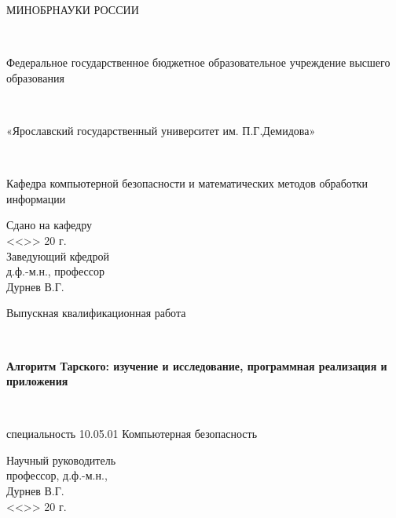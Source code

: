 \begin{titlepage}
    \begin{center}
        {\large МИНОБРНАУКИ РОССИИ
            
        ~
        
        Федеральное государственное бюджетное образовательное учреждение высшего образования		
        
        ~
        
        «Ярославский государственный университет им. П.Г.Демидова»
        
        ~
        
        Кафедра компьютерной безопасности и математических методов обработки информации}
        \vfill
        \newlength{\ML}
        \hfill\begin{minipage}{0.45\textwidth}
            \begin{flushright}
                Сдано на кафедру\\ 
                <<\underline{\hspace{1cm}}>> \underline{\hspace{2cm}} 20\underline{\hspace{1cm}} г.\\
                Заведующий кфедрой \\
                д.ф.-м.н., профессор\\
                \underline{\hspace{3cm}} Дурнев В.Г.\\
            \end{flushright}
        \end{minipage}%
        \vfill
        
        {\large Выпускная квалификационная работа}
        
        ~
        
        \textbf{{\large Алгоритм Тарского: изучение и исследование, программная реализация и приложения}}

        ~

        \large{специальность  10.05.01 Компьютерная безопасность}

    \end{center}
    \vfill
    
    
    \hfill\begin{minipage}{0.45\textwidth}
        \begin{flushright}
            Научный руководитель\\
            профессор, д.ф.-м.н.,\\
            \underline{\hspace{3cm}} Дурнев В.Г.\\
            <<\underline{\hspace{1cm}}>> \underline{\hspace{2cm}} 20\underline{\hspace{1cm}} г.
        \end{flushright}
        

\end{minipage}
\end{titlepage}
